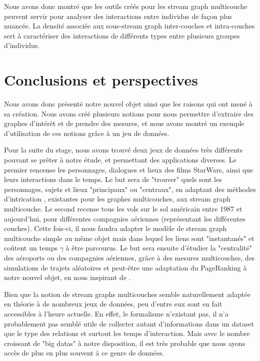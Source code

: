 \documentclass[11pt,a4paper]{article}
\theoremstyle{definition}
\theoremstyle{remark}
\theoremstyle{remark}
\def \stg {stream graph}
\def \stgm {stream graph multicouche}
\def \stgms {stream graphs multicouches}
\begin{document}
Nous avons donc montré que les outils créés pour les \stgm{} peuvent servir pour analyser des interactions entre individus de façon plus nuancée. La densité associée aux sous-\stg{} inter-couches et intra-couches sert à caractériser des interactions de différents types entre plusieurs groupes d'individus.


\section{Conclusions et perspectives}

    Nous avons donc présenté notre nouvel objet ainsi que les raisons qui ont mené à sa création. Nous avons créé plusieurs notions pour nous permettre d'extraire des graphes d'intérêt et de prendre des mesures, et nous avons montré un exemple d'utilisation de ces notions grâce à un jeu de données.
    
    Pour la suite du stage, nous avons trouvé deux jeux de données très différents pouvant se prêter à notre étude, et permettant des applications diverses.
    Le premier rencense les personnages, dialogues et lieux des films StarWars, ainsi que leurs interactions dans le temps. Le but sera de "trouver" quels sont les personnages, sujets et lieux "principaux" ou "centraux", en adaptant des méthodes d'intrication \cite{intrication}, existantes pour les graphes multicouches, aux \stgm{}.
    Le second recense tous les vols sur le sol américain entre 1987 et aujourd'hui, pour différentes compagnies aériennes (représentant les différentes couches). Cette fois-ci, il nous faudra adapter le modèle de \stgm{} simple au même objet mais dans lequel les liens sont "instantanés" et coûtent un temps $\gamma$ à être parcourus. Le but sera ensuite d'étudier la "centralité" des aéroports ou des compagnies aériennes, grâce à des mesures multicouches, des simulations de trajets aléatoires et peut-être une adaptation du PageRanking à notre nouvel objet, en nous inspirant de \cite{centraliteMulti}.
    
    Bien que la notion de \stgms{} semble naturellement adaptée en théorie à de nombreux jeux de données, peu d'entre eux sont en fait accessibles à l'heure actuelle. En effet, le formalisme n'existant pas, il n'a probablement pas semblé utile de collecter autant d'informations dans un dataset que le type des relations et surtout les temps d'interaction. Mais avec le nombre croissant de "big datas" à notre disposition, il est très probable que nous ayons accès de plus en plus souvent à ce genre de données.

    \nocite{*}
    
	
\end{document}
